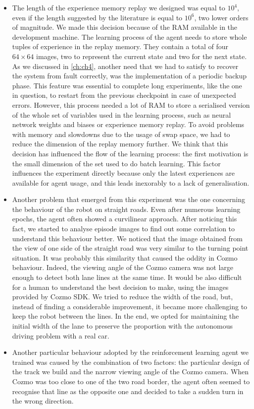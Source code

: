 \begin{itemize}
	\item The length of the experience memory replay we designed was equal to $10^4$, even if the length suggested by the literature is equal to $10^6$, two lower orders of magnitude.
	      We made this decision because of the RAM available in the development machine.
	      The learning process of the agent needs to store whole tuples of experience in the replay memory.
	      They contain a total of four $64 \times 64$ images, two to represent the current state and two for the next state.
	      As we discussed in \vref{ch:ch4}, another need that we had to satisfy to recover the system from fault correctly, was the implementation of a periodic backup phase.
	      This feature was essential to complete long experiments, like the one in question, to restart from the previous checkpoint in case of unexpected errors.
	      However, this process needed a lot of RAM to store a serialised version of the whole set of variables used in the learning process, such as neural network weights and biases or experience memory replay.
	      To avoid problems with memory and slowdowns due to the usage of swap space, we had to reduce the dimension of the replay memory further.
	      We think that this decision has influenced the flow of the learning process: the first motivation is the small dimension of the set used to do batch learning.
	      This factor influences the experiment directly because only the latest experiences are available for agent usage, and this leads inexorably to a lack of generalisation.
	\item Another problem that emerged from this experiment was the one concerning the behaviour of the robot on straight roads.
	      Even after numerous learning epochs, the agent often showed a curvilinear approach.
	      After noticing this fact, we started to analyse episode images to find out some correlation to understand this behaviour better.
	      We noticed that the image obtained from the view of one side of the straight road was very similar to the turning point situation.
	      It was probably this similarity that caused the oddity in Cozmo behaviour.
	      Indeed, the viewing angle of the Cozmo camera was not large enough to detect both lane lines at the same time.
	      It would be also difficult for a human to understand the best decision to make, using the images provided by Cozmo SDK.
	      We tried to reduce the width of the road, but, instead of finding a considerable improvement, it became more challenging to keep the robot between the lines.
	      In the end, we opted for maintaining the initial width of the lane to preserve the proportion with the autonomous driving problem with a real car.
	\item Another particular behaviour adopted by the reinforcement learning agent we trained was caused by the combination of two factors: the particular design of the track we build and the narrow viewing angle of the Cozmo camera.
	      When Cozmo was too close to one of the two road border, the agent often seemed to recognise that line as the opposite one and decided to take a sudden turn in the wrong direction.
\end{itemize}

